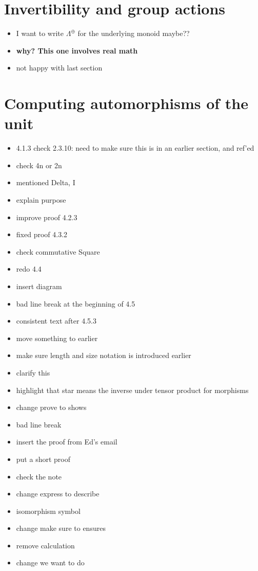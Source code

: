 \documentclass{amsart}
\begin{document}
\section{ Invertibility and group actions}

\begin{itemize}
\item I want to write $\Lambda^{\oplus}$ for the underlying monoid maybe??
\item \textbf{why? This one involves real math}
\item not happy with last section
\end{itemize}



\section{ Computing automorphisms of the unit}

\begin{itemize}




\item 4.1.3 check 2.3.10: need to make sure this is in an earlier section, and ref'ed
\item check 4n or 2n
\item mentioned Delta, I

\item explain purpose
\item improve proof 4.2.3
\item fixed proof 4.3.2
\item check commutative Square

\item redo 4.4
\item insert diagram
\item bad line break at the beginning of 4.5
\item consistent text after 4.5.3
\item move something to earlier
\item make sure length and size notation is introduced earlier
\item clarify this
\item highlight that star means the inverse under tensor product for morphisms
\item change prove to shows
\item bad line break
\item insert the proof from Ed's email
\item put a short proof
\item check the note
\item change express to describe
\item isomorphism symbol
\item change make sure to ensures
\item remove calculation
\item change we want to do
\end{itemize}
\end{document}
